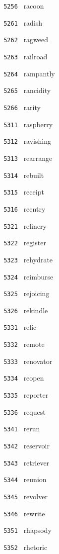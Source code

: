 \documentclass[11pt]{article}
\begin{document}
\begin{multicols}{6}
\noindent \texttt{ 5256 } racoon  \par
\noindent \texttt{ 5261 } radish  \par
\noindent \texttt{ 5262 } ragweed  \par
\noindent \texttt{ 5263 } railroad  \par
\noindent \texttt{ 5264 } rampantly  \par
\noindent \texttt{ 5265 } rancidity  \par
\noindent \texttt{ 5266 } rarity  \par
\noindent \texttt{ 5311 } raspberry  \par
\noindent \texttt{ 5312 } ravishing  \par
\noindent \texttt{ 5313 } rearrange  \par
\noindent \texttt{ 5314 } rebuilt  \par
\noindent \texttt{ 5315 } receipt  \par
\noindent \texttt{ 5316 } reentry  \par
\noindent \texttt{ 5321 } refinery  \par
\noindent \texttt{ 5322 } register  \par
\noindent \texttt{ 5323 } rehydrate  \par
\noindent \texttt{ 5324 } reimburse  \par
\noindent \texttt{ 5325 } rejoicing  \par
\noindent \texttt{ 5326 } rekindle  \par
\noindent \texttt{ 5331 } relic  \par
\noindent \texttt{ 5332 } remote  \par
\noindent \texttt{ 5333 } renovator  \par
\noindent \texttt{ 5334 } reopen  \par
\noindent \texttt{ 5335 } reporter  \par
\noindent \texttt{ 5336 } request  \par
\noindent \texttt{ 5341 } rerun  \par
\noindent \texttt{ 5342 } reservoir  \par
\noindent \texttt{ 5343 } retriever  \par
\noindent \texttt{ 5344 } reunion  \par
\noindent \texttt{ 5345 } revolver  \par
\noindent \texttt{ 5346 } rewrite  \par
\noindent \texttt{ 5351 } rhapsody  \par
\noindent \texttt{ 5352 } rhetoric  \par

\end{multicols}
\end{document}

